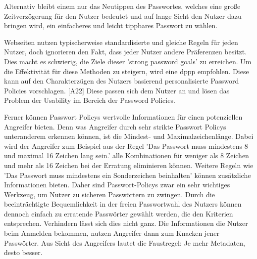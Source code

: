 Alternativ bleibt einem nur das Neutippen des Passwortes, welches eine große Zeitverzögerung für den Nutzer bedeutet und auf lange Sicht den Nutzer dazu bringen wird, ein einfacheres und leicht tippbares Passwort zu wählen.

Webseiten nutzen typischerweise standardisierte und gleiche Regeln für jeden Nutzer, doch ignorieren den Fakt, dass jeder Nutzer andere Präferenzen besitzt. Dies macht es schwierig, die Ziele dieser 'strong password goals' zu erreichen. Um die Effektivität für diese Methoden zu steigern, wird eine \ac{dppp} empfohlen. Diese kann auf den Charakterzügen des Nutzers basierend personalisierte Password Policies vorschlagen. [A22] Diese passen sich dem Nutzer an und lösen das Problem der Usability im Bereich der Password Policies.

Ferner können Passwort Policys wertvolle Informationen für einen potenziellen Angreifer bieten. Denn was Angreifer durch sehr strikte Passwort Policys unteranderem erkennen können, ist die Mindest- und Maximalzeichenlänge. Dabei wird der Angreifer zum Beispiel aus der Regel 'Das Passwort muss mindestens 8 und maximal 16 Zeichen lang sein.' alle Kombinationen für weniger als 8 Zeichen und mehr als 16 Zeichen bei der Erratung eliminieren können. Weitere Regeln wie 'Das Passwort muss mindestens ein Sonderzeichen beinhalten' können zusätzliche Informationen bieten. Daher sind Passwort-Policys zwar ein sehr wichtiges Werkzeug, um Nutzer zu sicheren Passwörtern zu zwingen. Durch die beeinträchtigte Bequemlichkeit in der freien Passwortwahl des Nutzers können dennoch einfach zu erratende Passwörter gewählt werden, die den Kriterien entsprechen. Verhindern lässt sich dies nicht ganz. Die Informationen die Nutzer beim Anmelden bekommen, nutzen Angreifer dann zum Knacken jener Passwörter. Aus Sicht des Angreifers lautet die Faustregel: Je mehr Metadaten, desto besser.
\newpage

